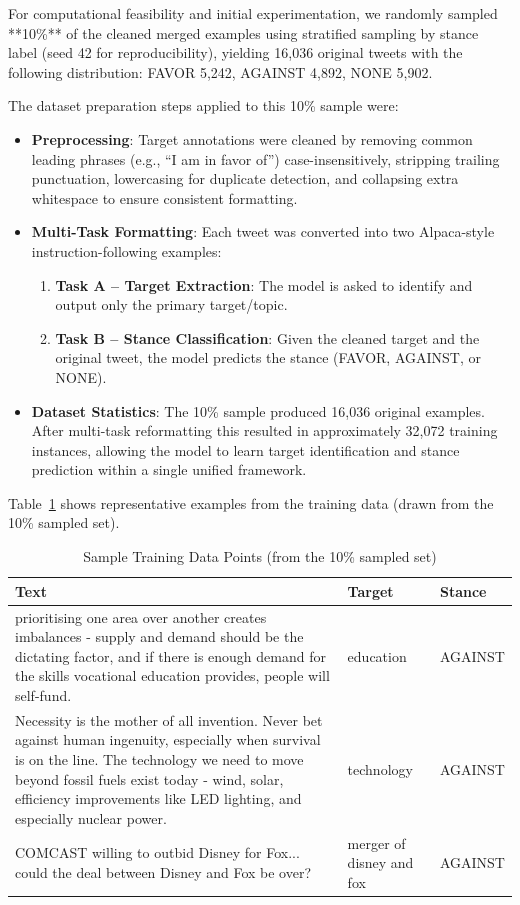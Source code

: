 \documentclass[conference]{IEEEtran}
\begin{document}
For computational feasibility and initial experimentation, we randomly sampled **10\%** of the cleaned merged examples using stratified sampling by stance label (seed 42 for reproducibility), yielding 16,036 original tweets with the following distribution: FAVOR 5,242, AGAINST 4,892, NONE 5,902.

The dataset preparation steps applied to this 10\% sample were:

\begin{itemize}
    \item \textbf{Preprocessing}: Target annotations were cleaned by removing common leading phrases (e.g., ``I am in favor of'') case-insensitively, stripping trailing punctuation, lowercasing for duplicate detection, and collapsing extra whitespace to ensure consistent formatting.
    \item \textbf{Multi-Task Formatting}: Each tweet was converted into two Alpaca-style instruction-following examples:
    \begin{enumerate}
        \item \textbf{Task A -- Target Extraction}: The model is asked to identify and output only the primary target/topic.
        \item \textbf{Task B -- Stance Classification}: Given the cleaned target and the original tweet, the model predicts the stance (FAVOR, AGAINST, or NONE).
    \end{enumerate}
    \item \textbf{Dataset Statistics}: The 10\% sample produced 16,036 original examples. After multi-task reformatting this resulted in approximately 32,072 training instances, allowing the model to learn target identification and stance prediction within a single unified framework.
\end{itemize}

Table~\ref{tab:training_samples} shows representative examples from the training data (drawn from the 10\% sampled set).


\begin{table}[!htbp]
\centering
\caption{Sample Training Data Points (from the 10\% sampled set)}
\label{tab:training_samples}
\small
\begin{tabular}{|p{}|p{}|p{}|}
\hline
\textbf{Text} & \textbf{Target} & \textbf{Stance} \\
\hline
prioritising one area over another creates imbalances - supply and demand should be the dictating factor, and if there is enough demand for the skills vocational education provides, people will self-fund. & education & AGAINST \\
\hline
Necessity is the mother of all invention. Never bet against human ingenuity, especially when survival is on the line. The technology we need to move beyond fossil fuels exist today - wind, solar, efficiency improvements like LED lighting, and especially nuclear power. & technology & AGAINST \\
\hline
COMCAST willing to outbid Disney for Fox... could the deal between Disney and Fox be over? & merger of disney and fox & AGAINST \\
\hline
\end{tabular}
\end{table}
\end{document}
